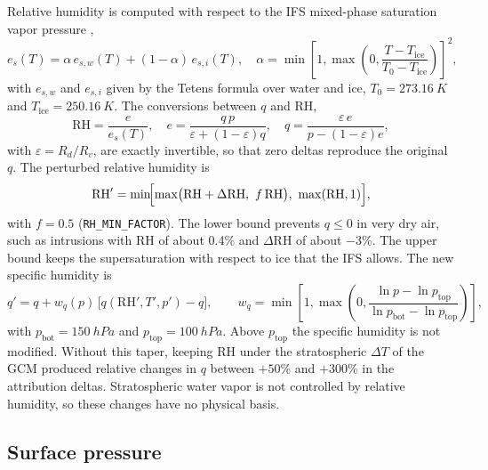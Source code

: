 \documentclass[11pt,a4paper]{article}
\newcommand{\code}[1]{\texttt{#1}}
\newcommand{\dT}{\Delta T}
\newcommand{\dRH}{\Delta \mathrm{RH}}
\begin{document}
Relative humidity is computed with respect to the IFS mixed-phase saturation
vapor pressure \citep{ECMWF_IFS_IV},
\begin{equation}
  e_s(T) = \alpha\, e_{s,w}(T) + (1-\alpha)\, e_{s,i}(T), \quad
  \alpha = \min\!\left[1, \max\!\left(0, \frac{T - T_{\mathrm{ice}}}{T_0 - T_{\mathrm{ice}}}\right)\right]^2,
\end{equation}
with $e_{s,w}$ and $e_{s,i}$ given by the Tetens formula over water and ice,
$T_0 = \SI{273.16}{K}$ and $T_{\mathrm{ice}} = \SI{250.16}{K}$. The
conversions between $q$ and RH,
\begin{equation}
  \mathrm{RH} = \frac{e}{e_s(T)}, \quad e = \frac{q\,p}{\varepsilon + (1-\varepsilon)q},
  \quad q = \frac{\varepsilon\, e}{p - (1-\varepsilon)e},
\end{equation}
with $\varepsilon = R_d/R_v$, are exactly invertible, so that zero deltas
reproduce the original $q$. The perturbed relative humidity is
\begin{equation}
  \mathrm{RH}' = \min\!\Bigl[\max\bigl(\mathrm{RH} + \dRH,\ f\,\mathrm{RH}\bigr),\ \max(\mathrm{RH}, 1)\Bigr],
\end{equation}
with $f = 0.5$ (\code{RH\_MIN\_FACTOR}). The lower bound prevents $q \le 0$
in very dry air, such as intrusions with RH of about 0.4\% and $\dRH$ of
about $-3$\%. The upper bound keeps the supersaturation with respect to ice
that the IFS allows. The new specific humidity is
\begin{equation}
  q' = q + w_q(p)\,\bigl[q(\mathrm{RH}', T', p') - q\bigr], \qquad
  w_q = \min\!\left[1, \max\!\left(0, \frac{\ln p - \ln p_{\mathrm{top}}}{\ln p_{\mathrm{bot}} - \ln p_{\mathrm{top}}}\right)\right],
\end{equation}
with $p_{\mathrm{bot}} = \SI{150}{hPa}$ and $p_{\mathrm{top}} = \SI{100}{hPa}$.
Above $p_{\mathrm{top}}$ the specific humidity is not modified. Without this
taper, keeping RH under the stratospheric $\dT$ of the GCM produced
relative changes in $q$ between $+50$\% and $+300$\% in the attribution
deltas. Stratospheric water vapor is not controlled by relative humidity, so
these changes have no physical basis.

\subsection{Surface pressure}
\end{document}
